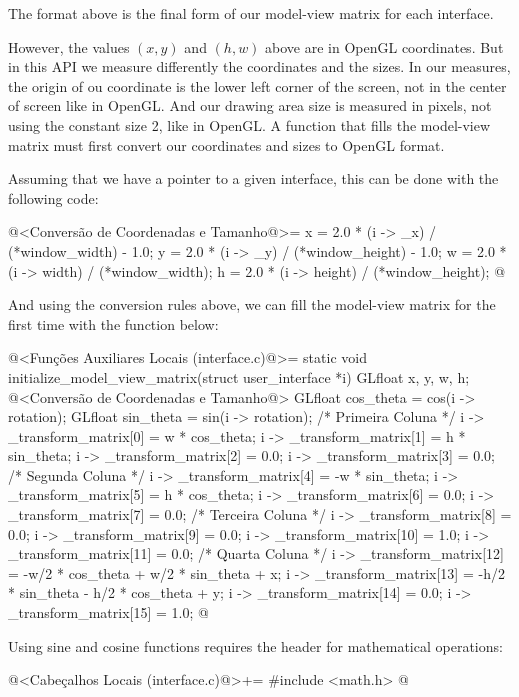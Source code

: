 The format above is the final form of our model-view matrix for each
interface.

However, the values $(x, y)$ and $(h, w)$ above are in OpenGL
coordinates. But in this API we measure differently the coordinates
and the sizes. In our measures, the origin of ou coordinate is the
lower left corner of the screen, not in the center of screen like in
OpenGL. And our drawing area size is measured in pixels, not using the
constant size 2, like in OpenGL. A function that fills the model-view
matrix must first convert our coordinates and sizes to OpenGL format.

Assuming that we have a pointer  to a given interface,
this can be done with the following code:

\iniciocodigo
@<Conversão de Coordenadas e Tamanho@>=
x = 2.0 * (i -> _x) / (*window_width) - 1.0;
y = 2.0 * (i -> _y) / (*window_height) - 1.0;
w = 2.0 * (i -> width) / (*window_width);
h = 2.0 * (i -> height) / (*window_height);
@
\fimcodigo

And using the conversion rules above, we can fill the model-view
matrix for the first time with the function below:

\iniciocodigo
@<Funções Auxiliares Locais (interface.c)@>=
static void initialize_model_view_matrix(struct user_interface *i){
  GLfloat x, y, w, h;
  @<Conversão de Coordenadas e Tamanho@>
  GLfloat cos_theta = cos(i -> rotation);
  GLfloat sin_theta = sin(i -> rotation);
  /* Primeira Coluna */
  i -> _transform_matrix[0] = w * cos_theta;
  i -> _transform_matrix[1] = h * sin_theta;
  i -> _transform_matrix[2] = 0.0;
  i -> _transform_matrix[3] = 0.0;
  /* Segunda Coluna */
  i -> _transform_matrix[4] = -w * sin_theta;
  i -> _transform_matrix[5] = h * cos_theta;
  i -> _transform_matrix[6] = 0.0;
  i -> _transform_matrix[7] = 0.0;
  /* Terceira Coluna */
  i -> _transform_matrix[8] = 0.0;
  i -> _transform_matrix[9] = 0.0;
  i -> _transform_matrix[10] = 1.0;
  i -> _transform_matrix[11] = 0.0;
  /* Quarta Coluna */
  i -> _transform_matrix[12] = -w/2 * cos_theta + w/2 * sin_theta + x;
  i -> _transform_matrix[13] = -h/2 * sin_theta - h/2 * cos_theta + y;
  i -> _transform_matrix[14] = 0.0;
  i -> _transform_matrix[15] = 1.0;
}
@
\fimcodigo

Using sine and cosine functions requires the header for mathematical
operations:

\iniciocodigo
@<Cabeçalhos Locais (interface.c)@>+=
#include <math.h>
@
\fimcodigo


